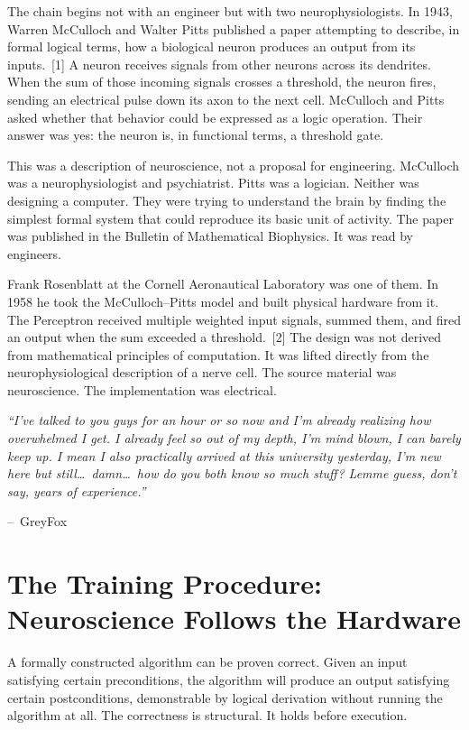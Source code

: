 \documentclass[11pt,a4paper]{article}
\renewenvironment{quote}
  {\list{}{\leftmargin=2.2em\rightmargin=2.2em\topsep=0.4em\parsep=0.3em}%
   \item\relax\itshape}
  {\endlist}
\newcommand{\attrib}[1]{\par\vspace{0.2em}\normalfont\small\hspace*{0em}--\ #1\par}
\begin{document}
The chain begins not with an engineer but with two neurophysiologists. In 1943, Warren McCulloch and Walter Pitts published a paper attempting to describe, in formal logical terms, how a biological neuron produces an output from its inputs.~[1] A neuron receives signals from other neurons across its dendrites. When the sum of those incoming signals crosses a threshold, the neuron fires, sending an electrical pulse down its axon to the next cell. McCulloch and Pitts asked whether that behavior could be expressed as a logic operation. Their answer was yes: the neuron is, in functional terms, a threshold gate.

This was a description of neuroscience, not a proposal for engineering. McCulloch was a neurophysiologist and psychiatrist. Pitts was a logician. Neither was designing a computer. They were trying to understand the brain by finding the simplest formal system that could reproduce its basic unit of activity. The paper was published in the Bulletin of Mathematical Biophysics. It was read by engineers.

Frank Rosenblatt at the Cornell Aeronautical Laboratory was one of them. In 1958 he took the McCulloch--Pitts model and built physical hardware from it. The Perceptron received multiple weighted input signals, summed them, and fired an output when the sum exceeded a threshold.~[2] The design was not derived from mathematical principles of computation. It was lifted directly from the neurophysiological description of a nerve cell. The source material was neuroscience. The implementation was electrical.

\begin{quote}
``I've talked to you guys for an hour or so now and I'm already realizing how overwhelmed I get. I already feel so out of my depth, I'm mind blown, I can barely keep up. I mean I also practically arrived at this university yesterday, I'm new here but still\ldots\ damn\ldots\ how do you both know so much stuff? Lemme guess, don't say, years of experience.''
\attrib{GreyFox}
\end{quote}

\section{The Training Procedure: Neuroscience Follows the Hardware}

A formally constructed algorithm can be proven correct. Given an input satisfying certain preconditions, the algorithm will produce an output satisfying certain postconditions, demonstrable by logical derivation without running the algorithm at all. The correctness is structural. It holds before execution.
\end{document}
